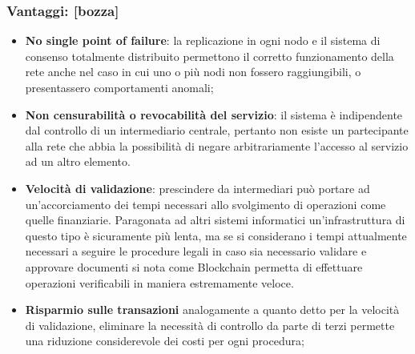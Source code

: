 		\subsubsection{Vantaggi: [bozza]}
			\begin{itemize}
				\item \textbf{No single point of failure}: la replicazione in ogni nodo e il sistema di consenso totalmente distribuito permettono il corretto funzionamento della rete anche nel caso in cui uno o più nodi non fossero raggiungibili, o presentassero comportamenti anomali;
				\item \textbf{Non censurabilità o revocabilità del servizio}: il sistema è indipendente dal controllo di un intermediario centrale, pertanto non esiste un partecipante alla rete che abbia la possibilità di negare arbitrariamente l'accesso al servizio ad un altro elemento.
				\item \textbf{Velocità di validazione}: prescindere da intermediari può portare ad un'accorciamento dei tempi necessari allo svolgimento di operazioni come quelle finanziarie. Paragonata ad altri sistemi informatici un'infrastruttura di questo tipo è sicuramente più lenta, ma se si considerano i tempi attualmente necessari a seguire le procedure legali in caso sia necessario validare e approvare documenti si nota come Blockchain permetta di effettuare operazioni verificabili in maniera estremamente veloce.
				\item \textbf{Risparmio sulle transazioni} analogamente a quanto detto per la velocità di validazione, eliminare la necessità di controllo da parte di terzi permette una riduzione considerevole dei costi per ogni procedura;
			\end{itemize}
